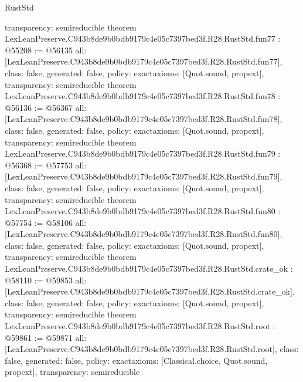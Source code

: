 \begin{lexlean}{RustStd}
\begin{coremodule}
{  transparency: semireducible
}
theorem LexLeanPreserve.C943b8de9b0bdb9179c4e05c7397bed3f.R28.RustStd.fun77 : @55208 := @56135 {
  all: [LexLeanPreserve.C943b8de9b0bdb9179c4e05c7397bed3f.R28.RustStd.fun77],
  class: false,
  generated: false,
  policy: exact{axioms: [Quot.sound, propext]},
  transparency: semireducible
}
theorem LexLeanPreserve.C943b8de9b0bdb9179c4e05c7397bed3f.R28.RustStd.fun78 : @56136 := @56367 {
  all: [LexLeanPreserve.C943b8de9b0bdb9179c4e05c7397bed3f.R28.RustStd.fun78],
  class: false,
  generated: false,
  policy: exact{axioms: [Quot.sound, propext]},
  transparency: semireducible
}
theorem LexLeanPreserve.C943b8de9b0bdb9179c4e05c7397bed3f.R28.RustStd.fun79 : @56368 := @57753 {
  all: [LexLeanPreserve.C943b8de9b0bdb9179c4e05c7397bed3f.R28.RustStd.fun79],
  class: false,
  generated: false,
  policy: exact{axioms: [Quot.sound, propext]},
  transparency: semireducible
}
theorem LexLeanPreserve.C943b8de9b0bdb9179c4e05c7397bed3f.R28.RustStd.fun80 : @57754 := @58106 {
  all: [LexLeanPreserve.C943b8de9b0bdb9179c4e05c7397bed3f.R28.RustStd.fun80],
  class: false,
  generated: false,
  policy: exact{axioms: [Quot.sound, propext]},
  transparency: semireducible
}
theorem LexLeanPreserve.C943b8de9b0bdb9179c4e05c7397bed3f.R28.RustStd.crate_ok : @58110 := @59853 {
  all: [LexLeanPreserve.C943b8de9b0bdb9179c4e05c7397bed3f.R28.RustStd.crate_ok],
  class: false,
  generated: false,
  policy: exact{axioms: [Quot.sound, propext]},
  transparency: semireducible
}
theorem LexLeanPreserve.C943b8de9b0bdb9179c4e05c7397bed3f.R28.RustStd.root : @59861 := @59871 {
  all: [LexLeanPreserve.C943b8de9b0bdb9179c4e05c7397bed3f.R28.RustStd.root],
  class: false,
  generated: false,
  policy: exact{axioms: [Classical.choice, Quot.sound, propext]},
  transparency: semireducible
}


\end{coremodule}
\end{lexlean}

